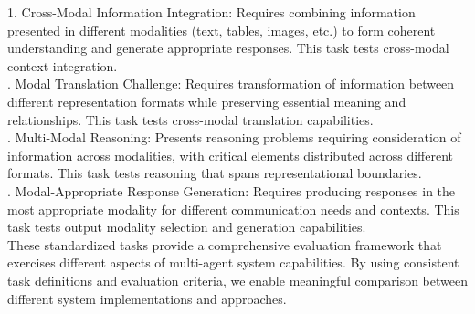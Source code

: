 1. Cross-Modal Information Integration: Requires combining information presented in different modalities (text, tables, images, etc.) to form coherent understanding and generate appropriate responses. This task tests cross-modal context integration.\\ . Modal Translation Challenge: Requires transformation of information between different representation formats while preserving essential meaning and relationships. This task tests cross-modal translation capabilities.\\ . Multi-Modal Reasoning: Presents reasoning problems requiring consideration of information across modalities, with critical elements distributed across different formats. This task tests reasoning that spans representational boundaries.\\ . Modal-Appropriate Response Generation: Requires producing responses in the most appropriate modality for different communication needs and contexts. This task tests output modality selection and generation capabilities.\\ \newline
These standardized tasks provide a comprehensive evaluation framework that exercises different aspects of multi-agent system capabilities. By using consistent task definitions and evaluation criteria, we enable meaningful comparison between different system implementations and approaches.\\
